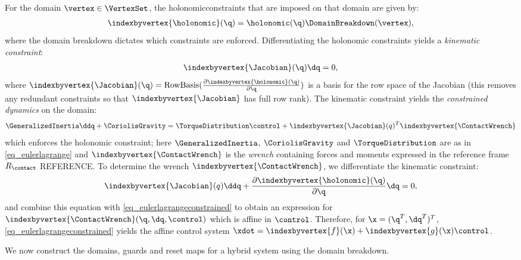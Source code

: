 For the domain $\vertex \in \VertexSet$, the holonomicconstraints that are imposed on that domain are given by:
\begin{align}
 \indexbyvertex{\holonomic}(\q) = \holonomic(\q)\DomainBreakdown(\vertex),
\end{align}
where the domain breakdown dictates which constraints are enforced. Differentiating the holonomic constraints yields a \textit{kinematic constraint}:
\begin{align}
 \indexbyvertex{\Jacobian}(\q) \dq = 0,
\end{align}
where $\indexbyvertex{\Jacobian}(\q) = \text{RowBasis} (\frac{\partial \indexbyvertex{\holonomic}(\q)}{\partial \q})$ is a basis for the row space of the Jacobian (this removes any redundant constraints so that $\indexbyvertex{\Jacobian}$ has full row rank). The kinematic constraint yields the \textit{constrained dynamics} on the domain:
\begin{align}
 \GeneralizedInertia\ddq + \CoriolisGravity = \TorqueDistribution \control + \indexbyvertex{\Jacobian}(q)^T \indexbyvertex{\ContactWrench}
 \label{eq_eulerlagrangeconstrained}
\end{align}
which enforces the holonomic constraint; here $\GeneralizedInertia$, $\CoriolisGravity$ and $\TorqueDistribution$ are as in \eqref{eq_eulerlagrange} and $\indexbyvertex{\ContactWrench}$ is the \textit{wrench} containing forces and moments expressed in the reference frame $R_\contact$ REFERENCE. To determine the wrench $\indexbyvertex{\ContactWrench}$, we differentiate the kinematic constraint:
\begin{align}
 \indexbyvertex{\Jacobian}(q) \ddq + \frac{\partial \indexbyvertex{\holonomic}(\q)}{\partial \q} \dq = 0,
\end{align}
and combine this equation with \eqref{eq_eulerlagrangeconstrained} to obtain an expression for $\indexbyvertex{\ContactWrench} (\q,\dq,\control)$ which is affine in $\control$. Therefore, for $\x = (\q^T, \dq^T)^T$, \eqref{eq_eulerlagrangeconstrained} yields the affine control system $\xdot = \indexbyvertex{f}(\x) + \indexbyvertex{g} (\x) \control$.

 We now construct the domains, guards and reset maps for a hybrid system using the domain breakdown.

